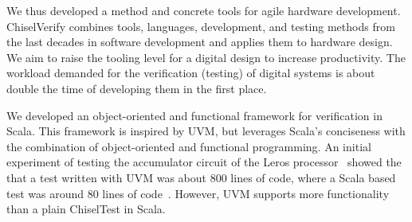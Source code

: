 \documentclass[conference]{IEEEtran}
\begin{document}
We thus developed a method and concrete tools for agile hardware development.
ChiselVerify combines tools, languages, development, and testing methods from the last decades in
software development and applies them to hardware design.
We aim to raise the tooling level for a digital design to increase productivity.
The workload demanded for the verification (testing) of digital systems is about double the time of developing
them in the first place.


We developed an object-oriented and functional framework for verification in Scala.
This framework is inspired by UVM, but leverages Scala's conciseness with the
combination of object-oriented and functional programming.
An initial experiment of testing the accumulator circuit of the Leros processor~\cite{leros:arcs2019}
showed the that a test written with UVM was about 800 lines of code, where a Scala based
test was around 80 lines of code~\cite{verify:chisel:2020}.
However, UVM supports more functionality than a plain ChiselTest in Scala.

%
%
%
\end{document}
